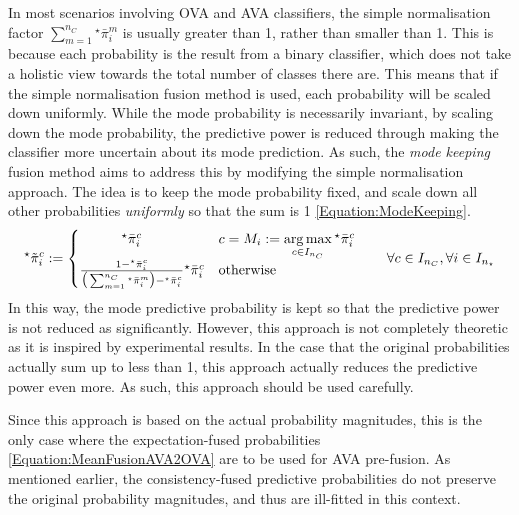 					In most scenarios involving OVA and AVA classifiers, the simple normalisation factor $\sum_{m = 1}^{n_{C}} {^{\star}}\bar{\pi}^{m}_{i}$ is usually greater than 1, rather than smaller than 1. This is because each probability is the result from a binary classifier, which does not take a holistic view towards the total number of classes there are. This means that if the simple normalisation fusion method is used, each probability will be scaled down uniformly. While the mode probability is necessarily invariant, by scaling down the mode probability, the predictive power is reduced through making the classifier more uncertain about its mode prediction. As such, the \textit{mode keeping} fusion method aims to address this by modifying the simple normalisation approach. The idea is to keep the mode probability fixed, and scale down all other probabilities \textit{uniformly} so that the sum is 1 \eqref{Equation:ModeKeeping}. \begin{equation}
						\begin{aligned}
							{^{\star}}\tilde{\pi}^{c}_{i} := \begin{cases}
								\qquad \quad {^{\star}}\bar{\pi}^{c}_{i} & c = M_{i} :=  \operatorname*{arg\,max}\limits_{c \in I_{n_{C}}} {^{\star}}\bar{\pi}^{c}_{i} \\
								\frac{1 - {^{\star}}\bar{\pi}^{c}_{i}}{\big(\sum_{m = 1}^{n_{C}} {^{\star}}\bar{\pi}^{m}_{i}\big) - {^{\star}}\bar{\pi}^{c}_{i}} {^{\star}}\bar{\pi}^{c}_{i} & \text{otherwise}
							\end{cases} \qquad \forall c \in I_{n_{C}}, \forall i \in I_{n_{\star}}
						\end{aligned}
					\label{Equation:ModeKeeping}
					\end{equation} In this way, the mode predictive probability is kept so that the predictive power is not reduced as significantly. However, this approach is not completely theoretic as it is inspired by experimental results. In the case that the original probabilities actually sum up to less than 1, this approach actually reduces the predictive power even more. As such, this approach should be used carefully.
					
					Since this approach is based on the actual probability magnitudes, this is the only case where the expectation-fused probabilities \eqref{Equation:MeanFusionAVA2OVA} are to be used for AVA pre-fusion. As mentioned earlier, the consistency-fused predictive probabilities do not preserve the original probability magnitudes, and thus are ill-fitted in this context.
					
